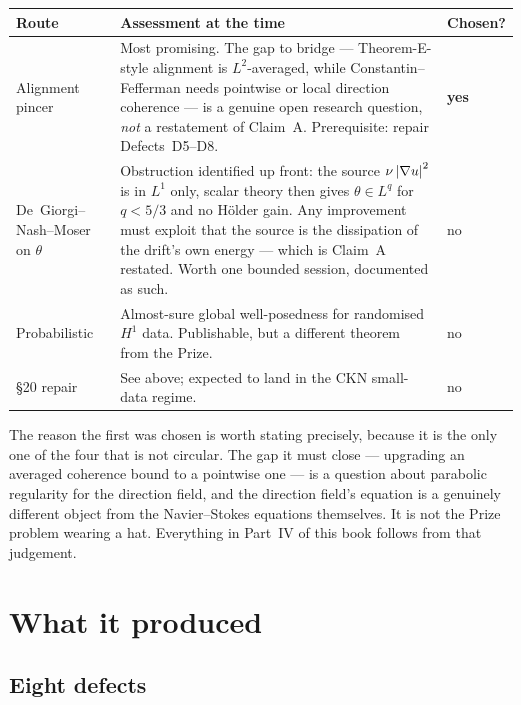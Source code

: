\begin{center}
\small
\begin{tabular}{@{}l p{} l@{}}
\toprule
Route & Assessment at the time & Chosen? \\
\midrule
Alignment pincer
  & Most promising. The gap to bridge --- Theorem-E-style alignment is
    \(L^2\)-averaged, while Constantin--Fefferman needs pointwise or local
    direction coherence --- is a genuine open research question, \emph{not} a
    restatement of Claim~A. Prerequisite: repair Defects~D5--D8.
  & \textbf{yes} \\[3pt]
De~Giorgi--Nash--Moser on \(\theta\)
  & Obstruction identified up front: the source \(\nu\left|\nabla u\right|^2\) is in
    \(L^1\) only, scalar theory then gives \(\theta\in L^q\) for \(q<5/3\) and
    no H\"older gain. Any improvement must exploit that the source is the
    dissipation of the drift's own energy --- which is Claim~A restated.
    Worth one bounded session, documented as such.
  & no \\[3pt]
Probabilistic
  & Almost-sure global well-posedness for randomised \(H^1\) data. Publishable,
    but a different theorem from the Prize.
  & no \\[3pt]
\S20 repair
  & See above; expected to land in the CKN small-data regime.
  & no \\
\bottomrule
\end{tabular}
\end{center}

\medskip
The reason the first was chosen is worth stating precisely, because it is the
only one of the four that is not circular. The gap it must close --- upgrading
an averaged coherence bound to a pointwise one --- is a question about
parabolic regularity for the direction field, and the direction field's
equation is a genuinely different object from the Navier--Stokes equations
themselves. It is not the Prize problem wearing a hat. Everything in Part~IV
of this book follows from that judgement.

\section{What it produced}
\label{sec:audit-produced}

\subsection{Eight defects}

